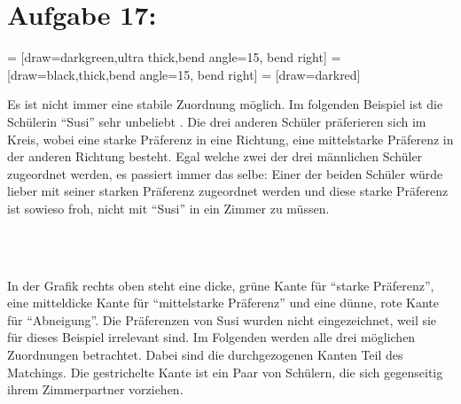 \documentclass[11pt]{scrartcl} %
\begin{document}
\section*{Aufgabe 17:}
\begin{compactenum}[(a)]
 = [draw=darkgreen,ultra thick,bend angle=15, bend right]
 = [draw=black,thick,bend angle=15, bend right]
 = [draw=darkred]

\item \begin{minipage}[t][][t]{0.65\textwidth}
Es ist nicht immer eine stabile Zuordnung möglich. Im folgenden Beispiel ist die Schülerin \enquote{Susi} sehr unbeliebt \frownie{}. Die drei anderen Schüler präferieren sich im Kreis, wobei eine starke Präferenz in eine Richtung, eine mittelstarke Präferenz in der anderen Richtung besteht. Egal welche zwei der drei männlichen Schüler zugeordnet werden, es passiert immer das selbe: Einer der beiden Schüler würde lieber mit seiner starken Präferenz zugeordnet werden und diese starke Präferenz ist sowieso froh, nicht mit \enquote{Susi} in ein Zimmer zu müssen.
\end{minipage}
\begin{minipage}[t][][c]{0.35\textwidth}
\begin{center}
    \\[0.5cm]
\end{center}
\end{minipage}\\[0.5cm]
In der Grafik rechts oben steht eine dicke, grüne Kante für \enquote{starke Präferenz}, eine mitteldicke Kante für \enquote{mittelstarke Präferenz} und eine dünne, rote Kante für \enquote{Abneigung}. Die Präferenzen von Susi wurden nicht eingezeichnet, weil sie für dieses Beispiel irrelevant sind. Im Folgenden werden alle drei möglichen Zuordnungen betrachtet. Dabei sind die durchgezogenen Kanten Teil des Matchings. Die gestrichelte Kante ist ein Paar von Schülern, die sich gegenseitig ihrem Zimmerpartner vorziehen.\\[0.3cm]

\end{compactenum}
\end{document}
